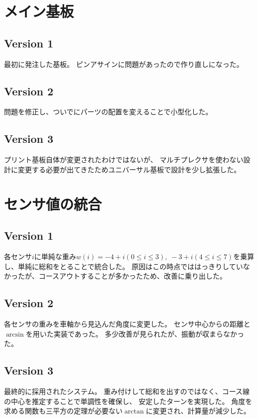\documentclass{ltjsreport}
\begin{document}
\section{メイン基板}
\subsection{Version 1}
最初に発注した基板。
ピンアサインに問題があったので作り直しになった。

\subsection{Version 2}
問題を修正し、ついでにパーツの配置を変えることで小型化した。


\subsection{Version 3}
プリント基板自体が変更されたわけではないが、
マルチプレクサを使わない設計に変更する必要が出てきたためユニバーサル基板で設計を少し拡張した。

\section{センサ値の統合}
\subsection{Version 1}
各センサ$i$に単純な重み$w(i) = -4+i(0\leq i \leq 3),\; -3+i (4 \leq i \leq 7)$を乗算し、単純に総和をとることで統合した。
原因はこの時点でははっきりしていなかったが、コースアウトすることが多かったため、改善に乗り出した。

\subsection{Version 2}
各センサの重みを車軸から見込んだ角度に変更した。
センサ中心からの距離と$\arcsin$を用いた実装であった。
多少改善が見られたが、振動が収まらなかった。

\subsection{Version 3}
最終的に採用されたシステム。
重み付けして総和を出すのではなく、コース線の中心を推定することで単調性を確保し、
安定したターンを実現した。
角度を求める関数も三平方の定理が必要ない$\arctan$に変更され、計算量が減少した。
\end{document}
